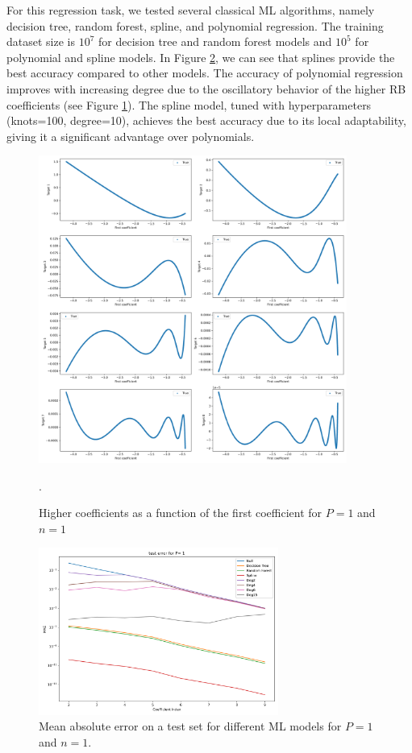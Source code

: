 \documentclass[graybox]{svmult}
\begin{document}
For this regression task, we tested several classical ML algorithms, namely decision tree, random forest, spline, and polynomial regression. The training dataset size is $10^7$ for decision tree and random forest models and $10^5$ for polynomial and spline models. In Figure \ref{fig:MLP1}, we can see that splines provide the best accuracy compared to other models. The accuracy of polynomial regression improves with increasing degree due to the oscillatory behavior of the higher RB coefficients (see Figure \ref{fig:dataP1}). The spline model, tuned with hyperparameters (knots=100, degree=10), achieves the best accuracy due to its local adaptability, giving it a significant advantage over polynomials.
\begin{figure}[!hb]
    \centering
\includegraphics[width=0.9\textwidth] {img-dataP1.png}
    \caption{ Higher coefficients as a function of the first coefficient for $P=1$ and $n=1$}.
    \label{fig:dataP1}
\end{figure}

\begin{figure}[!htbp]
    \centering
\includegraphics[width=0.7\textwidth] {img-MLP1.png}
    \caption{Mean absolute error on a test set for different ML models for $P=1$ and $n=1$.}
    \label{fig:MLP1}
\end{figure}
\end{document}
